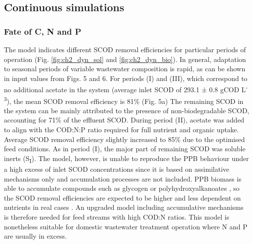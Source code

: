 \subsection{Continuous simulations}
\subsubsection{Fate of C, N and P}
The model indicates different SCOD removal efficiencies for particular periods of operation (Fig. \ref{fig:ch2_dyn_sol} and \ref{fig:ch2_dyn_bio}). In general, adaptation to seasonal periods of variable wastewater composition is rapid, as can be shown in input values from Figs. 5 and 6. For periods (I) and (III), which correspond to no additional acetate in the system (average inlet SCOD of 293.1 ± 0.8 gCOD L\textsuperscript{-3}), the mean SCOD removal efficiency is 81\% (Fig. 5a) The remaining SCOD in the system can be mainly attributed to the presence of non-biodegradable SCOD, accounting for 71\% of the effluent SCOD. During period (II), acetate was added to align with the COD:N:P ratio required for full nutrient and organic uptake. Average SCOD removal efficiency slightly increased to 85\% due to the optimised feed conditions. As in period (I), the major part of remaining SCOD was soluble inerts (S\textsubscript{I}). The model, however, is unable to reproduce the PPB behaviour under a high excess of inlet SCOD concentrations since it is based on assimilative mechanisms only and accumulation processes are not included. PPB biomass is able to accumulate compounds such as glycogen or polyhydroxyalkanoates \cite{Melnicki2009}, so the SCOD removal efficiencies are expected to be higher and less dependent on nutrients in real cases \cite{Hulsen2016,Hulsen2016a}. An upgraded model including accumulative mechanisms is therefore needed for feed streams with high COD:N ratios. This model is nonetheless suitable for domestic wastewater treatment operation where N and P are usually in excess. 

